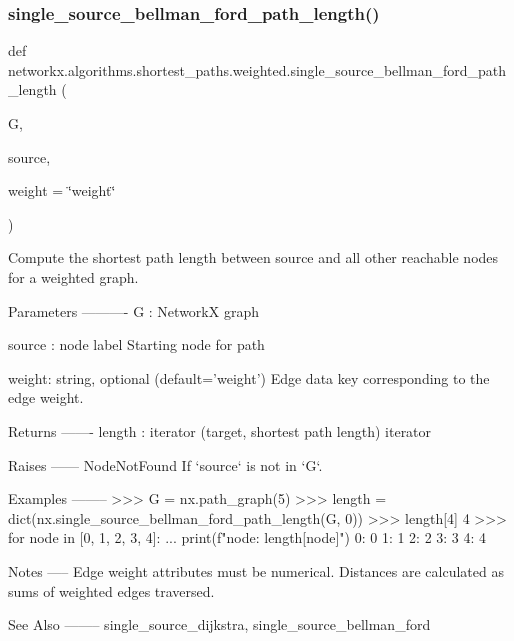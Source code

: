 \subsubsection{\texorpdfstring{single\+\_\+source\+\_\+bellman\+\_\+ford\+\_\+path\+\_\+length()}{single\_source\_bellman\_ford\_path\_length()}}
{\footnotesize\ttfamily def networkx.\+algorithms.\+shortest\+\_\+paths.\+weighted.\+single\+\_\+source\+\_\+bellman\+\_\+ford\+\_\+path\+\_\+length (\begin{DoxyParamCaption}\item[{}]{G,  }\item[{}]{source,  }\item[{}]{weight = {\ttfamily \char`\"{}weight\char`\"{}} }\end{DoxyParamCaption})}

\begin{DoxyVerb}Compute the shortest path length between source and all other
reachable nodes for a weighted graph.

Parameters
----------
G : NetworkX graph

source : node label
    Starting node for path

weight: string, optional (default='weight')
    Edge data key corresponding to the edge weight.

Returns
-------
length : iterator
    (target, shortest path length) iterator

Raises
------
NodeNotFound
    If `source` is not in `G`.

Examples
--------
>>> G = nx.path_graph(5)
>>> length = dict(nx.single_source_bellman_ford_path_length(G, 0))
>>> length[4]
4
>>> for node in [0, 1, 2, 3, 4]:
...     print(f"{node}: {length[node]}")
0: 0
1: 1
2: 2
3: 3
4: 4

Notes
-----
Edge weight attributes must be numerical.
Distances are calculated as sums of weighted edges traversed.

See Also
--------
single_source_dijkstra, single_source_bellman_ford\end{DoxyVerb}
 \mbox{\label{namespacenetworkx_1_1algorithms_1_1shortest__paths_1_1weighted_aefc651b4331fd0b95cac56fc491a0e81}} 
